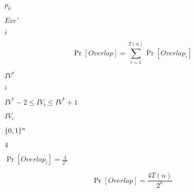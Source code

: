 \documentclass[10pt]{book}
\begin{document}
\begin{mdSnippets}
\begin{mdInlineSnippet}%
$p_k$\end{mdInlineSnippet}%
\begin{mdInlineSnippet}[0c3570ae86ed9d695d5d1d469a0b8bfa]%
$Eve'$\end{mdInlineSnippet}%
\begin{mdInlineSnippet}[865c0c0b4ab0e063e5caa3387c1a8741]%
$i$\end{mdInlineSnippet}%
\begin{mdDisplaySnippet}[71bca41672d3b892df3b6f962f925112]%
\[%
\Pr[Overlap] = \sum_{i=1}^{T(n)} \Pr[Overlap_i]
\]%
\end{mdDisplaySnippet}%
\begin{mdInlineSnippet}%
$IV^*$\end{mdInlineSnippet}%
\begin{mdInlineSnippet}[865c0c0b4ab0e063e5caa3387c1a8741]%
$i$\end{mdInlineSnippet}%
\begin{mdInlineSnippet}[b68373e3224725151901ce8e476471b1]%
$IV^* - 2 \leq IV_i \leq IV^* + 1$\end{mdInlineSnippet}%
\begin{mdInlineSnippet}[a672259312fe8429e1475b84f7397226]%
$IV_i$\end{mdInlineSnippet}%
\begin{mdInlineSnippet}[5867c9b098884eca2779f6d98d4b0b29]%
$\{0,1\}^n$\end{mdInlineSnippet}%
\begin{mdInlineSnippet}[a87ff679a2f3e71d9181a67b7542122c]%
$4$\end{mdInlineSnippet}%
\begin{mdInlineSnippet}%
$\Pr[Overlap_i] = \frac{4}{2^n}$\end{mdInlineSnippet}%
\begin{mdDisplaySnippet}[9fcaa20d7e2f37225e41d61a419d892b]%
\[%
\Pr[Overlap] = \frac{4T(n)}{2^n}
\]%
\end{mdDisplaySnippet}%
\begin{mdDisplaySnippet}[d7c5245954dfceffbd1f6a652a7e6136]%

\end{mdDisplaySnippet}
\end{mdSnippets}
\end{document}
